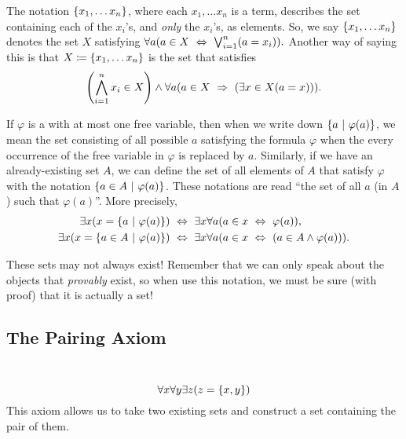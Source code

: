 \begin{definition}\label{not:setbuilder}
    The notation $\set*{x_1, \dots x_n}$,
    where each $x_1, \dots x_n$ is a term, 
    describes the set containing each of the $x_i$'s, and \emph{only} the $x_i$'s, as elements.
    So, we say $\set*{x_1, \dots x_n}$ denotes the set $X$ satisfying
    $
        \forall a \pn*{a \in X \iff \bigjoin_{i = 1}^{n}\pn*{a = x_i}}.
    $
    Another way of saying this is that $X \defn \set*{x_1, \dots x_n}$ is the set that satisfies
    \[
        \pn*{\bigmeet_{i = 1}^{n}x_i \in X}
             \meet \forall a \pn*{a \in X \implies \pn*{\exists x \in X \pn*{a = x}}}.
    \]
\end{definition}

\begin{definition}
    If $\varphi$ is a {\wff} with at most one free variable,
    then when we write down $\set*{a \suchthat \varphi(a)}$,
    we mean the set consisting of all possible $a$ satisfying the formula $\varphi$
    when the every occurrence of the free variable in $\varphi$ is replaced by $a$.
    Similarly, if we have an already-existing set $A$,
    we can define the set of all elements of $A$ that satisfy $\varphi$
    with the notation $\set*{a \in A \suchthat \varphi(a)}$.
    These notations are read ``the set of all $a$ (in $A$) such that $\varphi(a)$''.
    More precisely,
    \begin{align*}
        \exists x \pn*{x = \set*{a \suchthat \varphi(a)}}
            &\iff \exists x \forall a \pn*{a \in x \iff \varphi(a)},\\
        \exists x \pn*{x = \set*{a  \in A \suchthat \varphi(a)}}
            &\iff \exists x \forall a \pn*{a \in x \iff \pn*{a \in A \meet \varphi(a)}}.
    \end{align*}

    \begin{note}
        These sets may not always exist!
        Remember that we can only speak about the objects that \emph{provably} exist,
        so when use this notation,
        we must be sure (with proof) that it is actually a set!
    \end{note}
\end{definition}

\subsection{The Pairing Axiom}
\begin{axiom}[Pairing]\label{ax:pairing}
    ~\vspace{-\baselineskip}
    \[
        \forall x \forall y \exists z \pn*{z = \set*{x, y}}
    \]
    This axiom allows us to take two existing sets and construct a set containing the pair of them.
\end{axiom}

